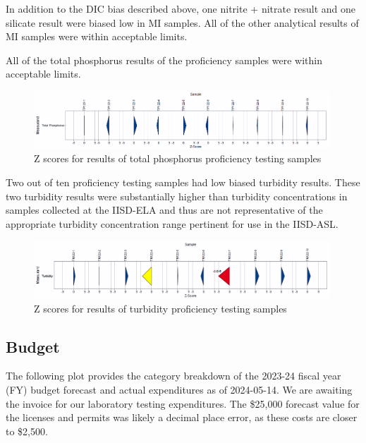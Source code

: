 \documentclass[
]{article}
\begin{document}
In addition to the DIC bias described above, one nitrite + nitrate
result and one silicate result were biased low in MI samples. All of the
other analytical results of MI samples were within acceptable limits.

All of the total phosphorus results of the proficiency samples were
within acceptable limits.

\begin{figure}[h]
\centering
  \includegraphics[width=0.99\textwidth]{2023_PT_TP_zscores.png}
  \caption{Z scores for results of total phosphorus proficiency testing samples}
\end{figure}

Two out of ten proficiency testing samples had low biased turbidity
results. These two turbidity results were substantially higher than
turbidity concentrations in samples collected at the IISD-ELA and thus
are not representative of the appropriate turbidity concentration range
pertinent for use in the IISD-ASL.

\begin{figure}[h]
\centering
  \includegraphics[width=0.99\textwidth]{2023_PT_TU_zscores.png}
  \caption{Z scores for results of turbidity proficiency testing samples}
\end{figure}
\pagebreak

\hypertarget{budget}{%
\subsection{Budget}\label{budget}}

The following plot provides the category breakdown of the 2023-24 fiscal
year (FY) budget forecast and actual expenditures as of 2024-05-14. We
are awaiting the invoice for our laboratory testing expenditures. The
\$25,000 forecast value for the licenses and permits was likely a
decimal place error, as these costs are closer to \$2,500.
\end{document}

